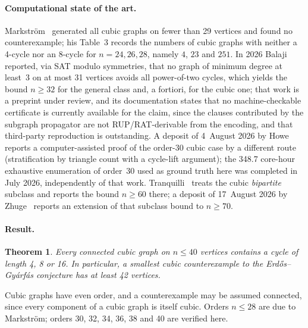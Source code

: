 \documentclass[11pt]{article}
\newtheorem{theorem}{Theorem}
\begin{document}
\paragraph{Computational state of the art.}
Markstr\"om~\cite{markstrom2004} generated all cubic graphs on fewer than 29
vertices and found no counterexample; his Table~3 records the numbers of cubic
graphs with neither a 4-cycle nor an 8-cycle for $n=24,26,28$, namely $4$, $23$
and $251$. In 2026 Balaji~\cite{balaji2026} reported, via SAT modulo
symmetries, that no graph of minimum degree at least~3 on at most 31 vertices
avoids all power-of-two cycles, which yields the bound $n\ge 32$ for the
general class and, a fortiori, for the cubic one; that work is a preprint under
review, and its documentation states that no machine-checkable certificate is
currently available for the claim, since the clauses contributed by the
subgraph propagator are not RUP/RAT-derivable from the encoding, and that
third-party reproduction is outstanding. A deposit of 4~August 2026 by
Howe~\cite{howe2026} reports a computer-assisted proof of the order-30 cubic
case by a different route (stratification by triangle count with a cycle-lift
argument); the 348.7 core-hour exhaustive enumeration of order~30 used as
ground truth here was completed in July 2026, independently of that work.
Tranquilli~\cite{tranquilli2026} treats the cubic \emph{bipartite} subclass
and reports the bound $n\ge 60$ there; a deposit of 17~August 2026 by
Zhuge~\cite{zhuge2026} reports an extension of that subclass bound to
$n\ge 70$.

\paragraph{Result.}
\begin{theorem}\label{thm:main}
Every connected cubic graph on $n \le 40$ vertices contains a cycle of length
4, 8 or 16. In particular, a smallest cubic counterexample to the
Erd\H{o}s--Gy\'arf\'as conjecture has at least 42 vertices.
\end{theorem}

Cubic graphs have even order, and a counterexample may be assumed connected,
since every component of a cubic graph is itself cubic. Orders $n\le 28$ are
due to Markstr\"om; orders 30, 32, 34, 36, 38 and 40 are verified here.
\end{document}
